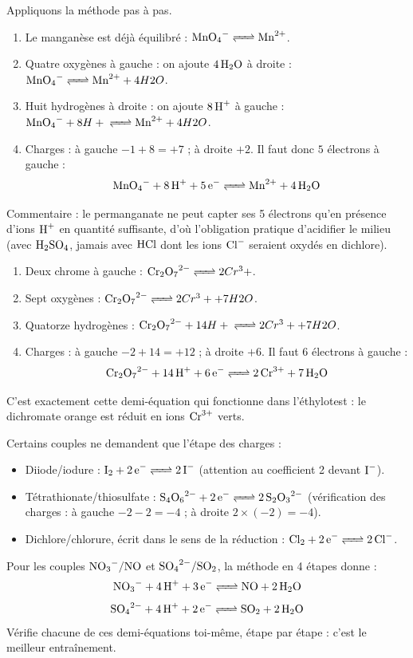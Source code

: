 \documentclass[11pt]{article}
\begin{document}
\begin{exemplebox}
Appliquons la méthode pas à pas.
\begin{enumerate}
\item Le manganèse est déjà équilibré : $\ce{MnO4-} \ce{<=>} \ce{Mn^2+}$.
\item Quatre oxygènes à gauche : on ajoute $4\,\ce{H2O}$ à droite : $\ce{MnO4-} \ce{<=>} \ce{Mn^2+} + 4 H2O$.
\item Huit hydrogènes à droite : on ajoute $8\,\ce{H+}$ à gauche : $\ce{MnO4-} + 8 H+ \ce{<=>} \ce{Mn^2+} + 4 H2O$.
\item Charges : à gauche $-1 + 8 = +7$ ; à droite $+2$. Il faut donc $5$ électrons à gauche :
\[ \ce{MnO4- + 8 H+ + 5 e- <=> Mn^2+ + 4 H2O} \]
\end{enumerate}
Commentaire : le permanganate ne peut capter ses 5 électrons qu'en présence d'ions $\ce{H+}$ en quantité suffisante, d'où l'obligation pratique d'acidifier le milieu (avec $\ce{H2SO4}$, jamais avec $\ce{HCl}$ dont les ions $\ce{Cl-}$ seraient oxydés en dichlore).
\end{exemplebox}

\begin{exemplebox}
\begin{enumerate}
\item Deux chrome à gauche : $\ce{Cr2O7^2-} \ce{<=>} 2 Cr^3+$.
\item Sept oxygènes : $\ce{Cr2O7^2-} \ce{<=>} 2 Cr^3+ + 7 H2O$.
\item Quatorze hydrogènes : $\ce{Cr2O7^2-} + 14 H+ \ce{<=>} 2 Cr^3+ + 7 H2O$.
\item Charges : à gauche $-2 + 14 = +12$ ; à droite $+6$. Il faut 6 électrons à gauche :
\[ \ce{Cr2O7^2- + 14 H+ + 6 e- <=> 2 Cr^3+ + 7 H2O} \]
\end{enumerate}
C'est exactement cette demi-équation qui fonctionne dans l'éthylotest : le dichromate orange est réduit en ions $\ce{Cr^3+}$ verts.
\end{exemplebox}

\begin{exemplebox}
Certains couples ne demandent que l'étape des charges :
\begin{itemize}
\item Diiode/iodure : $\ce{I2 + 2 e- <=> 2 I-}$ (attention au coefficient 2 devant $\ce{I-}$).
\item Tétrathionate/thiosulfate : $\ce{S4O6^2- + 2 e- <=> 2 S2O3^2-}$ (vérification des charges : à gauche $-2 - 2 = -4$ ; à droite $2 \times (-2) = -4$).
\item Dichlore/chlorure, écrit dans le sens de la réduction : $\ce{Cl2 + 2 e- <=> 2 Cl-}$.
\end{itemize}
Pour les couples $\ce{NO3-}/\ce{NO}$ et $\ce{SO4^2-}/\ce{SO2}$, la méthode en 4 étapes donne :
\[ \ce{NO3- + 4 H+ + 3 e- <=> NO + 2 H2O} \]
\[ \ce{SO4^2- + 4 H+ + 2 e- <=> SO2 + 2 H2O} \]
Vérifie chacune de ces demi-équations toi-même, étape par étape : c'est le meilleur entraînement.
\end{exemplebox}
\end{document}
